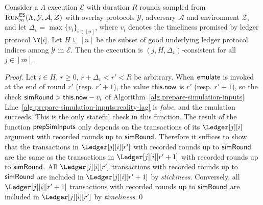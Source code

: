 \begin{lemma}\label{lem:consistency}
  Consider a \rollerblade $\Lambda$ execution $\mathcal{E}$ with duration $R$ rounds
  sampled from $\textsc{Run}^{\textsf{ES}}_m(\Lambda, \mathcal{Y}, \mathcal{A}, \mathcal{Z})$
  with overlay protocols $\mathcal{Y}$, adversary $\mathcal{A}$ and environment $\mathcal{Z}$,
  and let $\Delta_v = \max\{v_i\}_{i \in [n]}$,
  where $v_i$ denotes the timeliness
  promised by ledger protocol $\Y[i]$.
  Let $H \subseteq [n]$ be the subset of good underlying ledger protocol indices among $\mathcal{Y}$
  in $\mathcal{E}$.
  Then the execution is $(j, H, \Delta_v)$-consistent for all $j \in [m]$.
\end{lemma}
\begin{proof}
  Let $i \in H$, $r \geq 0$, $r + \Delta_v < r' < R$ be arbitrary.
  When $\textsf{emulate}$ is invoked at the end of round $r'$ (resp. $r' + 1$),
  the value $\textsf{this}.\textsf{now}$
  is $r'$ (resp. $r' + 1$), so the check $\textsf{simRound} > \textsf{this}.\textsf{now} - v_i$ of Algorithm~\ref{alg.prepare-simulation-inputs}
  Line~\ref{alg.prepare-simulation-inputs:reality-lag} is \emph{false}, and the emulation
  succeeds. This is the only stateful check in this function.
  The result of the function $\textsf{prepSimInputs}$ only depends on the transactions of
  its $\Ledger[j][i]$ argument with recorded rounds up to $\textsf{simRound}$.
  Therefore it suffices to show that the transactions in
  $\Ledger[j][i][r']$ with recorded rounds up to $\textsf{simRound}$ are the same
  as the transactions in $\Ledger[j][i][r' + 1]$ with recorded rounds up to $\textsf{simRound}$.
  All $\Ledger[j][i][r']$ transactions with recorded rounds up to $\textsf{simRound}$
  are included in $\Ledger[j][i][r' + 1]$ by \emph{stickiness}.
  Conversely, all $\Ledger[j][i][r' + 1]$ transactions with recorded rounds up to $\textsf{simRound}$
  are included in $\Ledger[j][i][r']$ by \emph{timeliness}.\qed
\end{proof}


